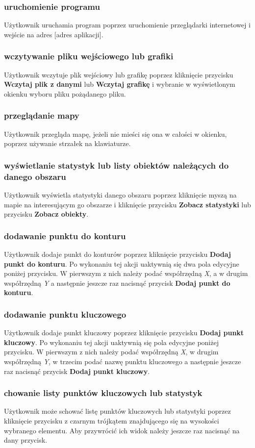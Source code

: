 \documentclass[hidelinks,10pt,a4paper]{article}
\begin{document}
\subsubsection{uruchomienie programu}
Użytkownik uruchamia program poprzez uruchomienie przeglądarki internetowej i wejście na adres [adres aplikacji]. 
\subsubsection{wczytywanie pliku wejściowego lub grafiki}
Użytkownik wczytuje plik wejściowy lub grafikę poprzez kliknięcie przycisku \textbf{Wczytaj plik z danymi} lub \textbf{Wczytaj grafikę} i wybranie w wyświetlonym okienku wyboru pliku pożądanego pliku.
\subsubsection{przeglądanie mapy}
Użytkownik przegląda mapę, jeżeli nie mieści się ona w całości w okienku, poprzez używanie strzałek na klawiaturze. 
\subsubsection{wyświetlanie statystyk lub listy obiektów należących do danego obszaru}
Użytkownik wyświetla statystyki danego obszaru poprzez kliknięcie myszą na mapie na interesującym go obszarze i kliknięcie przycisku \textbf{Zobacz statystyki} lub przycisku \textbf{Zobacz obiekty}.
\subsubsection{dodawanie punktu do konturu}
Użytkownik dodaje punkt do konturów poprzez kliknięcie przycisku \textbf{Dodaj punkt do konturu}.
Po wykonaniu tej akcji uaktywnią się dwa pola edycyjne poniżej przycisku.
W pierwszym z nich należy podać współrzędną \textit{X}, a w drugim współrzędną \textit{Y} a następnie jeszcze raz nacisnąć przycisk \textbf{Dodaj punkt do konturu}.
\subsubsection{dodawanie punktu kluczowego}
Użytkownik dodaje punkt kluczowy poprzez kliknięcie przycisku \textbf{Dodaj punkt kluczowy}.
Po wykonaniu tej akcji uaktywnią się pola edycyjne poniżej przycisku.
W pierwszym z nich należy podać współrzędną \textit{X}, w drugim współrzędną \textit{Y}, w trzecim podać nazwę punktu kluczowego a następnie jeszcze raz nacisnąć przycisk \textbf{Dodaj punkt kluczowy}.
\subsubsection{chowanie listy punktów kluczowych lub statystyk}
Użytkownik może schować listę punktów kluczowych lub statystyki poprzez kliknięcie przycisku z czarnym trójkątem znajdującego się na wysokości wybranego elementu.
Aby przywrócić ich widok należy jeszcze raz nacisnąć na dany przycisk.
\end{document}
